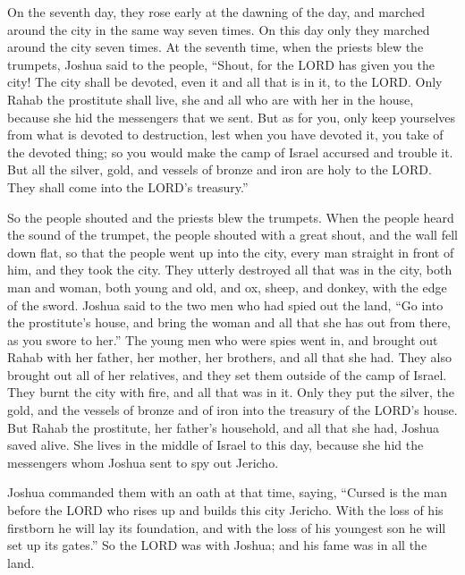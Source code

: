  On the seventh day, they rose early at the dawning of
the day, and marched around the city in the same way seven times. On
this day only they marched around the city seven times. 
At the seventh time, when the priests blew the trumpets, Joshua said to
the people, ``Shout, for the LORD has given you the city!
 The city shall be devoted, even it and all that is in
it, to the LORD. Only Rahab the prostitute shall live, she and all who
are with her in the house, because she hid the messengers that we sent.
 But as for you, only keep yourselves from what is
devoted to destruction, lest when you have devoted it, you take of the
devoted thing; so you would make the camp of Israel accursed and trouble
it.  But all the silver, gold, and vessels of bronze and
iron are holy to the LORD. They shall come into the LORD's treasury.''

 So the people shouted and the priests blew the trumpets.
When the people heard the sound of the trumpet, the people shouted with
a great shout, and the wall fell down flat, so that the people went up
into the city, every man straight in front of him, and they took the
city.  They utterly destroyed all that was in the city,
both man and woman, both young and old, and ox, sheep, and donkey, with
the edge of the sword.  Joshua said to the two men who
had spied out the land, ``Go into the prostitute's house, and bring the
woman and all that she has out from there, as you swore to her.''
 The young men who were spies went in, and brought out
Rahab with her father, her mother, her brothers, and all that she had.
They also brought out all of her relatives, and they set them outside of
the camp of Israel.  They burnt the city with fire, and
all that was in it. Only they put the silver, the gold, and the vessels
of bronze and of iron into the treasury of the LORD's house.
 But Rahab the prostitute, her father's household, and
all that she had, Joshua saved alive. She lives in the middle of Israel
to this day, because she hid the messengers whom Joshua sent to spy out
Jericho.

 Joshua commanded them with an oath at that time, saying,
``Cursed is the man before the LORD who rises up and builds this city
Jericho. With the loss of his firstborn he will lay its foundation, and
with the loss of his youngest son he will set up its gates.''
 So the LORD was with Joshua; and his fame was in all the
land.

